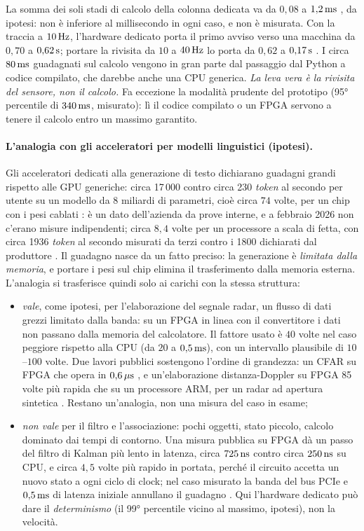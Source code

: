 La somma dei soli stadi di calcolo della colonna dedicata va da $0{,}08$ a $1{,}2\,\mathrm{ms}$ , da ipotesi: non è inferiore al millisecondo in ogni caso, e non è misurata. Con la traccia a $10\,\mathrm{Hz}$, l'hardware dedicato porta il primo avviso verso una macchina da $0{,}70$ a $0{,}62\,\mathrm{s}$; portare la rivisita da $10$ a $40\,\mathrm{Hz}$ lo porta da $0{,}62$ a $0{,}17\,\mathrm{s}$ . I circa $80\,\mathrm{ms}$ guadagnati sul calcolo vengono in gran parte dal passaggio dal Python a codice compilato, che darebbe anche una CPU generica. \emph{La leva vera è la rivisita del sensore, non il calcolo.} Fa eccezione la modalità prudente del prototipo (95° percentile di $340\,\mathrm{ms}$, misurato): lì il codice compilato o un FPGA servono a tenere il calcolo entro un massimo garantito.

\paragraph{L'analogia con gli acceleratori per modelli linguistici (ipotesi).} Gli acceleratori dedicati alla generazione di testo dichiarano guadagni grandi rispetto alle GPU generiche: circa 17\,000 contro circa 230 \emph{token} al secondo per utente su un modello da 8 miliardi di parametri, cioè circa $74$ volte, per un chip con i pesi cablati \citep{heise2026-taalas}: è un dato dell'azienda da prove interne, e a febbraio 2026 non c'erano misure indipendenti; circa $8{,}4$ volte per un processore a scala di fetta, con circa 1936 \emph{token} al secondo misurati da terzi contro i 1800 dichiarati dal produttore \citep{heise2026-taalas,cerebras2024-inference}. Il guadagno nasce da un fatto preciso: la generazione è \emph{limitata dalla memoria}, e portare i pesi sul chip elimina il trasferimento dalla memoria esterna. L'analogia si trasferisce quindi solo ai carichi con la stessa struttura:
\begin{itemize}
\item \emph{vale}, come ipotesi, per l'elaborazione del segnale radar, un flusso di dati grezzi limitato dalla banda: su un FPGA in linea con il convertitore i dati non passano dalla memoria del calcolatore. Il fattore usato è $40$ volte nel caso peggiore rispetto alla CPU (da $20$ a $0{,}5\,\mathrm{ms}$), con un intervallo plausibile di $10$--$100$ volte. Due lavori pubblici sostengono l'ordine di grandezza: un CFAR su FPGA che opera in $0{,}6\,\mathrm{\mu s}$ \citep{sim2023}, e un'elaborazione distanza-Doppler su FPGA 85 volte più rapida che su un processore ARM, per un radar ad apertura sintetica \citep{choi2021}. Restano un'analogia, non una misura del caso in esame;
\item \emph{non vale} per il filtro e l'associazione: pochi oggetti, stato piccolo, calcolo dominato dai tempi di contorno. Una misura pubblica su FPGA dà un passo del filtro di Kalman più lento in latenza, circa $725\,\mathrm{ns}$ contro circa $250\,\mathrm{ns}$ su CPU, e circa $4{,}5$ volte più rapido in portata, perché il circuito accetta un nuovo stato a ogni ciclo di clock; nel caso misurato la banda del bus PCIe e $0{,}5\,\mathrm{ms}$ di latenza iniziale annullano il guadagno \citep{summers2018}. Qui l'hardware dedicato può dare il \emph{determinismo} (il 99° percentile vicino al massimo, ipotesi), non la velocità.
\end{itemize}
